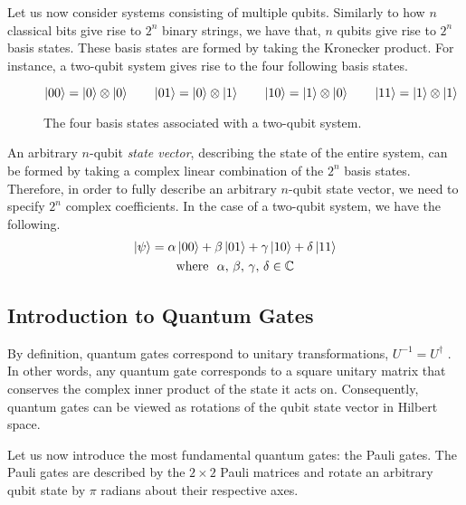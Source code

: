 Let us now consider systems consisting of multiple qubits. Similarly to how $n$ classical bits give rise to $2^n$ binary strings, we have that, $n$ qubits give rise to $2^n$ basis states. These basis states are formed by taking the Kronecker product. For instance, a two-qubit system gives rise to the four following basis states.

\begin{figure}[H]
    \centering
    \begin{equation*}
        \ket{00} = \ket 0 \otimes \ket 0 \qquad
        \ket{01} = \ket 0 \otimes \ket 1 \qquad
        \ket{10} = \ket 1 \otimes \ket 0 \qquad
        \ket{11} = \ket 1 \otimes \ket 1
    \end{equation*}
    \caption{The four basis states associated with a two-qubit system.}
    \label{two-qubit-states}
\end{figure}

An arbitrary $n$-qubit \textit{state vector}, describing the state of the entire system, can be formed by taking a complex linear combination of the $2^n$ basis states. Therefore, in order to fully describe an arbitrary $n$-qubit state vector, we need to specify $2^n$ complex coefficients. In the case of a two-qubit system, we have the following.
\begin{gather*}
    \ket\psi =
    \alpha \ket{00} +
    \beta \ket{01} +
    \gamma \ket{10} +
    \delta \ket{11} \\
    \text{where} \,\,\,\, \alpha, \, \beta, \, \gamma, \, \delta \in \mathbb{C}
\end{gather*}

\newpage
\subsection{Introduction to Quantum Gates}%
\label{quantum-gates}

By definition, quantum gates correspond to unitary transformations, $U^{-1} = U^\dagger$ \cite{Nielsen2012}. In other words, any quantum gate corresponds to a square unitary matrix that conserves the complex inner product of the state it acts on. Consequently, quantum gates can be viewed as rotations of the qubit state vector in Hilbert space.

Let us now introduce the most fundamental quantum gates: the Pauli gates. The Pauli gates are described by the $2 \times 2$ Pauli matrices and rotate an arbitrary qubit state by $\pi$ radians about their respective axes.

